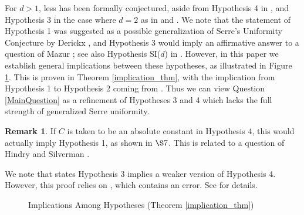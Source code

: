 \documentclass{amsart}
\theoremstyle{definition}
\newtheorem{remark}[theorem]{Remark}
\begin{document}
    For $d>1$, less has been formally conjectured, aside from Hypothesis 4 in \cite[Conjecture 1.4]{CP18}, and Hypothesis 3 in the case where $d=2$ as in \cite[Conjecture 1.1]{QuadPointsConj} and \cite[Conjecture 18]{BalakrishnanMazur}. We note  that the statement of Hypothesis 1 was suggested as a possible generalization of Serre's Uniformity Conjecture by Derickx \cite{DerickxPost}, and Hypothesis 3 would imply an affirmative answer to a question of Mazur \cite[Question C]{MazurBonn}; see also Hypothesis SI($d$) in \cite{CP18}.  However, in this paper we establish general implications between these hypotheses, as illustrated in Figure \ref{ImplicationDiagram}. This is proven in Theorem \ref{implication_thm}, with the  implication from Hypothesis 1 to Hypothesis 2 coming from \cite{BELOV}. Thus we can view Question \ref{MainQuestion} as a refinement of Hypotheses 3 and 4 which lacks the full strength of generalized Serre uniformity.

    \begin{remark}      If $C$ is taken to be an absolute constant in Hypothesis 4, this would actually imply Hypothesis 1, as shown in $\S7$. This is related to a question of Hindry and Silverman \cite[$\S3$]{HS99}.
    
    We note that \cite[Theorem 1.7]{CP18} states  Hypothesis 3 implies a weaker version of Hypothesis 4. However, this proof relies on \cite[Theorem 1.2]{LR16}, which contains an error. See \cite[$\S 1$]{Smith23} for details. 
    \end{remark}

\begin{figure}
    \begin{center}
\end{center}
\caption{Implications Among Hypotheses (Theorem \ref{implication_thm})} \label{ImplicationDiagram}
\end{figure}
\end{document}
